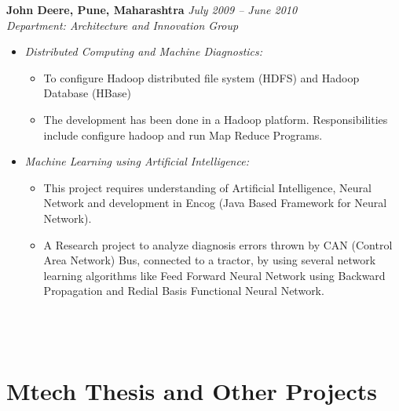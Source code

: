 \documentclass[margin,line]{resume}
\begin{document}
\begin{resume}
    \textbf{John Deere, Pune, Maharashtra }\hfill \textsl{July 2009 -- June 2010}\vspace{0mm}\\\vspace{0mm}%
    \textsl{Department: Architecture and Innovation Group} 
     \begin{itemize}
     \item \textsl{Distributed Computing and Machine Diagnostics:} 
            \begin{itemize}
             \item To configure Hadoop distributed file system (HDFS) and Hadoop Database (HBase)
             \item The development has been done in a Hadoop platform. Responsibilities include configure hadoop and run Map Reduce Programs.
             \end{itemize}
     \item \textsl{Machine Learning using Artificial Intelligence:}
             \begin{itemize}
              \item This project requires understanding of Artificial Intelligence, Neural Network and development in Encog (Java Based Framework for Neural Network).
	       \item A Research project to analyze diagnosis errors thrown by CAN (Control Area  Network) Bus,
   connected to a tractor, by using several network learning algorithms like Feed Forward Neural Network using Backward Propagation and Redial Basis Functional Neural Network.\\\\\\\\
               \end{itemize}
      \end{itemize}
      

       
    \section{\mysidestyle Mtech Thesis and Other Projects}


\end{resume}
\end{document}
